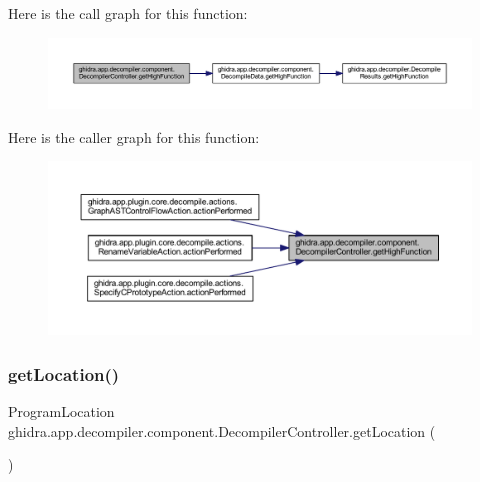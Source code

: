 Here is the call graph for this function\+:
\nopagebreak
\begin{figure}[H]
\begin{center}
\leavevmode
\includegraphics[width=350pt]{classghidra_1_1app_1_1decompiler_1_1component_1_1_decompiler_controller_aee461c894e3925775b4444fec34edc35_cgraph}
\end{center}
\end{figure}
Here is the caller graph for this function\+:
\nopagebreak
\begin{figure}[H]
\begin{center}
\leavevmode
\includegraphics[width=350pt]{classghidra_1_1app_1_1decompiler_1_1component_1_1_decompiler_controller_aee461c894e3925775b4444fec34edc35_icgraph}
\end{center}
\end{figure}
\mbox{\label{classghidra_1_1app_1_1decompiler_1_1component_1_1_decompiler_controller_a80c1e9eb44608b4b7d04a513e29feb24}} 
\subsubsection{\texorpdfstring{getLocation()}{getLocation()}}
{\footnotesize\ttfamily Program\+Location ghidra.\+app.\+decompiler.\+component.\+Decompiler\+Controller.\+get\+Location (\begin{DoxyParamCaption}{ }\end{DoxyParamCaption})\hspace{0.3cm}{\ttfamily [inline]}}



